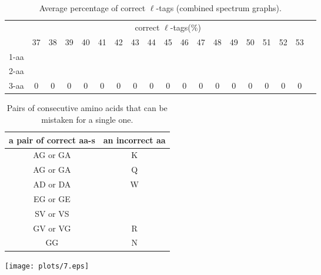 \documentclass{article}
\begin{document}
\begin{table}[h]\tiny
\vspace{3mm}
{\centering
\begin{center}
\begin{tabular}{|l|c|c|c|c|c|c|c|c|c|c|c|c|c|c|c|c|c|c|}
  \hline
  & \multicolumn{ 17 }{|c|}{correct $\ell$-tags(\%)} \\
  \cline{2- 18}
    & 37 & 38 & 39 & 40 & 41 & 42 & 43 & 44 & 45 & 46 & 47 & 48 & 49 & 50 & 51 & 52 & 53\\
  \hline
1-aa  &  &  &  &  &  &  &  &  &  &  &  &  &  &  &  &  & \\
2-aa  &  &  &  &  &  &  &  &  &  &  &  &  &  &  &  &  & \\
3-aa  & 0 & 0 & 0 & 0 & 0 & 0 & 0 & 0 & 0 & 0 & 0 & 0 & 0 & 0 & 0 & 0 & 0\\
 \hline
\end{tabular}
\end{center}
\par}
\centering

\caption{ Average percentage of correct $\ell$-tags (combined spectrum graphs).}

\vspace{3mm}
\label{table:table6}
\end{table}
\begin{table}[ht]\footnotesize
\vspace{3mm}
{\centering
\begin{center}
\begin{tabular}{|c|c|}
  \hline
  a pair of correct aa-s & an incorrect aa \\
  \hline
  AG or GA & K \\
  \hline
  AG or GA & Q \\
  \hline
  AD or DA & \multirow{3}{*}{W} \\
  EG or GE & \\
  SV or VS & \\
  \hline
  GV or VG & R \\
  \hline
  GG & N \\
  \hline
\end{tabular}
\end{center}
\par}
\centering
\caption{Pairs of consecutive amino acids that can be mistaken for a single one.}
\vspace{3mm}
\label{table:errors-vs}
\end{table}
\texttt{[image: plots/7.eps]}
\end{document}
